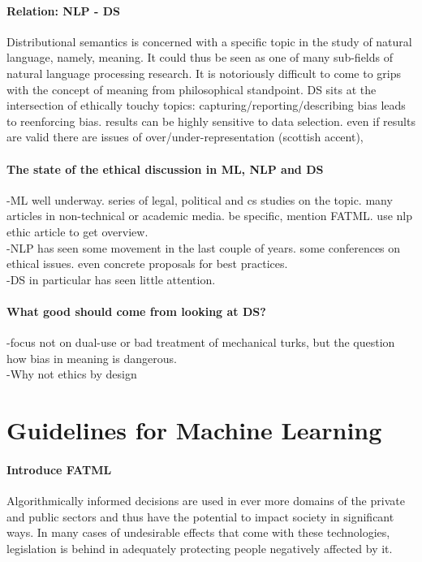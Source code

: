 \documentclass{article}
\begin{document}
\paragraph{Relation: NLP - DS}
Distributional semantics is concerned with a specific topic in the study of natural language, namely, meaning. It could thus be seen as one of many sub-fields of natural language processing research. 
It is notoriously difficult to come to grips with the concept of meaning from philosophical standpoint.
DS sits at the intersection of ethically touchy topics: capturing/reporting/describing bias leads to reenforcing bias. results can be highly sensitive to data selection. even if results are valid there are issues of over/under-representation (scottish accent),
 
\paragraph{The state of the ethical discussion in ML, NLP and DS}
-ML well underway. series of legal, political and cs studies on the topic. many articles in non-technical or academic media. be specific, mention FATML. use nlp ethic article to get overview.\\
-NLP has seen some movement in the last couple of years. some conferences on ethical issues. even concrete proposals for best practices.\\
-DS in particular has seen little attention.

\paragraph{What good should come from looking at DS?}
-focus not on dual-use or bad treatment of mechanical turks, but the question how bias in meaning is dangerous.\\
-Why not ethics by design
\section{Guidelines for Machine Learning}\hypertarget{sec2}{}
\paragraph{Introduce FATML}
Algorithmically informed decisions are used in ever more domains of the private and public sectors and thus have the potential to impact society in significant ways. In many cases of undesirable effects that come with these technologies, legislation is behind in adequately protecting people negatively affected by it.
\end{document}
